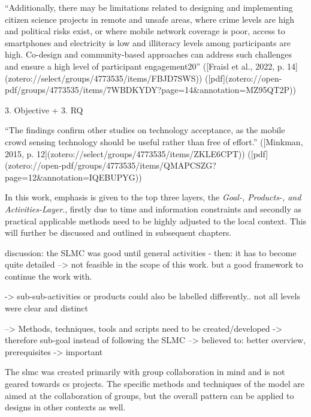 “Additionally, there may be limitations related to designing and implementing citizen science projects in remote and unsafe areas, where crime levels are high and political risks exist, or where mobile network coverage is poor, access to smartphones and electricity is low and illiteracy levels among participants are high. Co-design and community-based approaches can address such challenges and ensure a high level of participant engagement20” ([Fraisl et al., 2022, p. 14](zotero://select/groups/4773535/items/FBJD7SWS)) ([pdf](zotero://open-pdf/groups/4773535/items/7WBDKYDY?page=14&annotation=MZ95QT2P))




3. Objective + 3. RQ

“The findings confirm other studies on technology acceptance, as the mobile crowd sensing technology should be useful rather than free of effort.” ([Minkman, 2015, p. 12](zotero://select/groups/4773535/items/ZKLE6CPT)) ([pdf](zotero://open-pdf/groups/4773535/items/QMAPCSZG?page=12&annotation=IQEBUPYG))

In this work, emphasis is given to the top three layers, the \textit{Goal-, Products-, and Activities-Layer}., firstly due to time and information constraints and secondly as practical applicable methods need to be highly adjusted to the local context. This will further be discussed and outlined in subsequent chapters.

discussion: the SLMC was good until general activities - then: it has to become quite detailed --> not feasible in the scope of this work. but a good framework to continue the work with.

-> sub-sub-activities or products could also be labelled differently.. not all levels were clear and distinct

--> Methods, techniques, tools and scripts need to be created/developed -> therefore sub-goal instead of following the SLMC --> believed to: better overview, prerequisites -> important

The \acrfull{slmc} was created primarily with group collaboration in mind and is not geared towards \acrshort*{cs} projects. The specific methods and techniques of the model are aimed at the collaboration of groups, but the overall pattern can be applied to designs in other contexts as well. 

